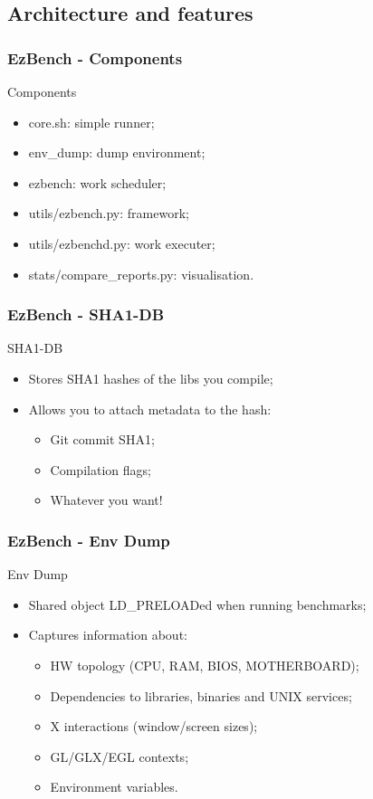 \documentclass[11pt,english,compress]{beamer}
\begin{document}
\subsection{Architecture and features}

\begin{frame}
	\frametitle{EzBench - Components}

	\begin{block}{Components}
		\begin{itemize}
			\item core.sh: simple runner;\pause
			\item env\_dump: dump environment;\pause
			\item ezbench: work scheduler;\pause
			\item utils/ezbench.py: framework;\pause
			\item utils/ezbenchd.py: work executer;\pause
			\item stats/compare\_reports.py: visualisation.
		\end{itemize}
	\end{block}
\end{frame}

\begin{frame}
	\frametitle{EzBench - SHA1-DB}

	\begin{block}{SHA1-DB}
		\begin{itemize}
			\item Stores SHA1 hashes of the libs you compile;\pause
			\item Allows you to attach metadata to the hash:\pause
			\begin{itemize}
				\item Git commit SHA1;\pause
				\item Compilation flags;\pause
				\item Whatever you want!
			\end{itemize}
		\end{itemize}
	\end{block}
\end{frame}

\begin{frame}
	\frametitle{EzBench - Env Dump}

	\begin{block}{Env Dump}
		\begin{itemize}
			\item Shared object LD\_PRELOADed when running benchmarks;\pause
			\item Captures information about:\pause
			\begin{itemize}
				\item HW topology (CPU, RAM, BIOS, MOTHERBOARD);\pause
				\item Dependencies to libraries, binaries and UNIX services;\pause
				\item X interactions (window/screen sizes);\pause
				\item GL/GLX/EGL contexts;\pause
				\item Environment variables.
			\end{itemize}
		\end{itemize}
	\end{block}
\end{frame}
\end{document}
